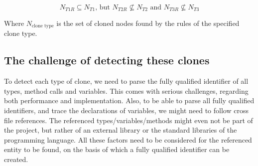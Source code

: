\begin{equation}\label{eq:typerelation2}
N_{T1R} \subseteq N_{T1} \text{, but } N_{T2R} \nsubseteq N_{T2} \text{ and } N_{T3R} \nsubseteq N_{T3}
\end{equation}

Where $N_{\text{clone type}}$ is the set of cloned nodes found by the rules of the specified clone type.

\subsection{The challenge of detecting these clones}\label{chap:challenge}
To detect each type of clone, we need to parse the fully qualified identifier of all types, method calls and variables. This comes with serious challenges, regarding both performance and implementation. Also, to be able to parse all fully qualified identifiers, and trace the declarations of variables, we might need to follow cross file references. The referenced types/variables/methods might even not be part of the project, but rather of an external library or the standard libraries of the programming language. All these factors need to be considered for the referenced entity to be found, on the basis of which a fully qualified identifier can be created.

